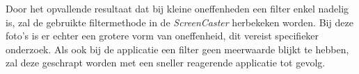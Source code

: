 Door het opvallende resultaat dat bij kleine oneffenheden een filter enkel nadelig is, zal de gebruikte filtermethode in de {\it ScreenCaster} herbekeken worden. Bij deze foto's is er echter een grotere vorm van oneffenheid, dit vereist specifieker onderzoek. Als ook bij de applicatie een filter geen meerwaarde blijkt te hebben, zal deze geschrapt worden met een sneller reagerende applicatie tot gevolg.